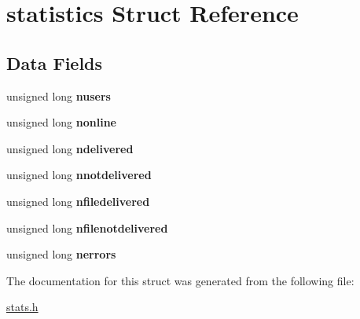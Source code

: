 \hypertarget{structstatistics}{}\section{statistics Struct Reference}
\label{structstatistics}
\subsection*{Data Fields}
\begin{DoxyCompactItemize}
\item 
\mbox{\label{structstatistics_adacd907234b18252c5e1ec947deca41f}} 
unsigned long {\bfseries nusers}
\item 
\mbox{\label{structstatistics_aff99cf9b6aa2d22f48f543a906603ae7}} 
unsigned long {\bfseries nonline}
\item 
\mbox{\label{structstatistics_a08e845e3d8ec6f288e20a4693ff09123}} 
unsigned long {\bfseries ndelivered}
\item 
\mbox{\label{structstatistics_a544cca2dcba9741ea008e54ab3b4eef8}} 
unsigned long {\bfseries nnotdelivered}
\item 
\mbox{\label{structstatistics_a0b799597236f59771d2df823cc295de1}} 
unsigned long {\bfseries nfiledelivered}
\item 
\mbox{\label{structstatistics_a3f46d11b2e9a9b2cf0294f5f55fe3d32}} 
unsigned long {\bfseries nfilenotdelivered}
\item 
\mbox{\label{structstatistics_a6b8853d9bf908c15a1c6444ac8e62c20}} 
unsigned long {\bfseries nerrors}
\end{DoxyCompactItemize}


The documentation for this struct was generated from the following file\+:\begin{DoxyCompactItemize}
\item 
\hyperlink{stats_8h}{stats.\+h}\end{DoxyCompactItemize}
